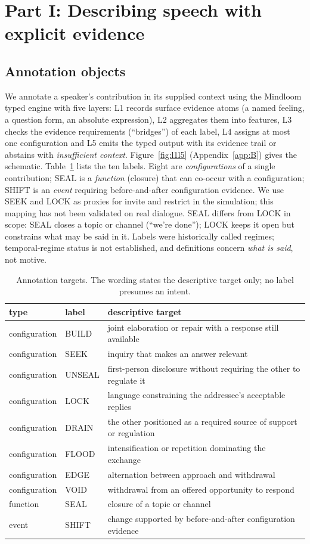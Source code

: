 \documentclass[runningheads]{llncs}
\begin{document}
\section{Part I: Describing speech with explicit evidence}
\label{sec:part1}
\subsection{Annotation objects}
We annotate a speaker's contribution in its supplied context using the Mindloom typed engine with five layers: L1 records surface evidence atoms (a named feeling, a question form, an absolute expression), L2 aggregates them into features, L3 checks the evidence requirements (``bridges'') of each label, L4 assigns at most one configuration and L5 emits the typed output with its evidence trail or abstains with \emph{insufficient context}. Figure~\ref{fig:l1l5} (Appendix~\ref{app:B}) gives the schematic. Table~\ref{tab:labels} lists the ten labels. Eight are \emph{configurations} of a single contribution; SEAL is a \emph{function} (closure) that can co-occur with a configuration; SHIFT is an \emph{event} requiring before-and-after configuration evidence. We use SEEK and LOCK as proxies for invite and restrict in the simulation; this mapping has not been validated on real dialogue. SEAL differs from LOCK in scope: SEAL closes a topic or channel (``we're done''); LOCK keeps it open but constrains what may be said in it. Labels were historically called regimes; temporal-regime status is not established, and definitions concern \emph{what is said}, not motive.

\begin{table}[t]
\centering\caption{Annotation targets. The wording states the descriptive target only; no label presumes an intent.}
\label{tab:labels}
\footnotesize
\begin{tabular}{@{}llp{7.6cm}@{}}
\toprule
type & label & descriptive target\\
\midrule
configuration & BUILD & joint elaboration or repair with a response still available\\
configuration & SEEK & inquiry that makes an answer relevant\\
configuration & UNSEAL & first-person disclosure without requiring the other to regulate it\\
configuration & LOCK & language constraining the addressee's acceptable replies\\
configuration & DRAIN & the other positioned as a required source of support or regulation\\
configuration & FLOOD & intensification or repetition dominating the exchange\\
configuration & EDGE & alternation between approach and withdrawal\\
configuration & VOID & withdrawal from an offered opportunity to respond\\
function & SEAL & closure of a topic or channel\\
event & SHIFT & change supported by before-and-after configuration evidence\\
\bottomrule
\end{tabular}
\end{table}
\end{document}
